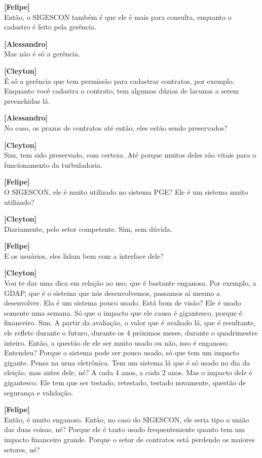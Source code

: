 \documentclass[12pt,a4paper]{article}
\begin{document}
\begin{entrevista}
    \textbf{[Felipe]} \\
    Então, o SIGESCON também é que ele é mais para consulta, enquanto o cadastro é feito pela gerência.

    \textbf{[Alessandro]} \\
    Mas não é só a gerência.

    \textbf{[Cleyton]} \\
    É só a gerência que tem permissão para cadastrar contratos, por exemplo. Enquanto você cadastra o contrato, tem algumas dúzias de lacunas a serem preenchidas lá.

    \textbf{[Alessandro]} \\
    No caso, os prazos de contratos até então, eles estão sendo preservados?

    \textbf{[Cleyton]} \\
    Sim, tem sido preservado, com certeza. Até porque muitos deles são vitais para o funcionamento da turbuladoria.

    \textbf{[Felipe]} \\
    O SIGESCON, ele é muito utilizado no sistema PGE? Ele é um sistema muito utilizado?

    \textbf{[Cleyton]} \\
    Diariamente, pelo setor competente. Sim, sem dúvida.

    \textbf{[Felipe]} \\
    E os usuários, eles lidam bem com a interface dele?

    \textbf{[Cleyton]} \\
    Vou te dar uma dica em relação ao uso, que é bastante enganosa. Por exemplo, a GDAP, que é o sistema que nós desenvolvemos, passamos aí mesmo a desenvolver. Ela é um sistema pouco usado. Está bom de visão? Ele é usado somente uma semana. Só que o impacto que ele causa é gigantesco, porque é financeiro. Sim. A partir da avaliação, o valor que é avaliado lá, que é resultante, ele reflete durante o futuro, durante os 4 próximos meses, durante o quadrimestre inteiro. Então, a questão de ele ser muito usado ou não, isso é enganoso. Entendeu? Porque o sistema pode ser pouco usado, só que tem um impacto gigante. Pensa na urna eletrônica. Tem um sistema lá que é só usado no dia da eleição, mas antes dele, né? A cada 4 anos, a cada 2 anos. Mas o impacto dele é gigantesco. Ele tem que ser testado, retestado, testado novamente, questão de segurança e validação.

    \textbf{[Felipe]} \\
    Então, é muito enganoso. Então, no caso do SIGESCON, ele seria tipo a união das duas coisas, né? Porque ele é tanto usado frequentemente quanto tem um impacto financeiro grande. Porque o setor de contratos está perdendo os maiores setores, né?


\end{entrevista}
\end{document}
